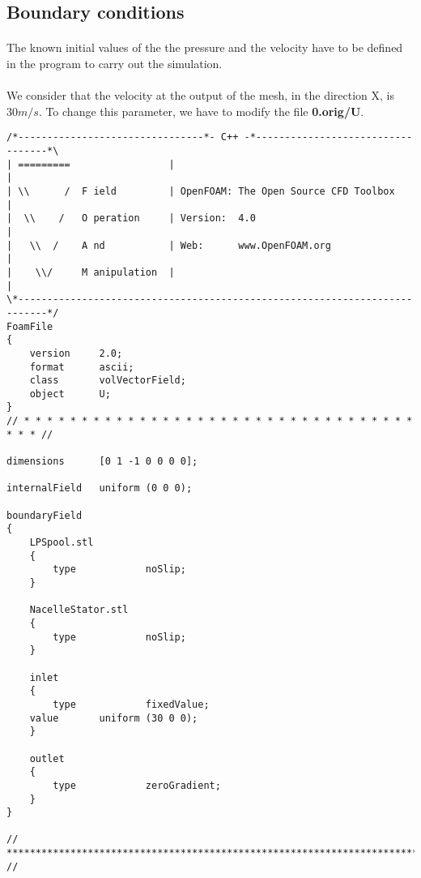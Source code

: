 \subsection{Boundary conditions}
\paragraph{}
The known initial values of the the pressure and the velocity have to be defined in the program to carry out the simulation.

\paragraph{}
We consider that the velocity at the output of the mesh, in the direction X, is $30 m/s$. To change this parameter, we have to modify the file \textbf{0.orig/U}.


\begin{footnotesize}

\begin{verbatim}
/*--------------------------------*- C++ -*----------------------------------*\
| =========                 |                                                 |
| \\      /  F ield         | OpenFOAM: The Open Source CFD Toolbox           |
|  \\    /   O peration     | Version:  4.0                                   |
|   \\  /    A nd           | Web:      www.OpenFOAM.org                      |
|    \\/     M anipulation  |                                                 |
\*---------------------------------------------------------------------------*/
FoamFile
{
    version     2.0;
    format      ascii;
    class       volVectorField;
    object      U;
}
// * * * * * * * * * * * * * * * * * * * * * * * * * * * * * * * * * * * * * //

dimensions      [0 1 -1 0 0 0 0];

internalField   uniform (0 0 0);

boundaryField
{
    LPSpool.stl
    {
        type            noSlip;
    }

    NacelleStator.stl
    {
        type            noSlip;
    }

    inlet
    {
        type            fixedValue;
	value		uniform (30 0 0);
    }

    outlet
    {
        type            zeroGradient;
    }
}

// ************************************************************************* //

\end{verbatim}

\end{footnotesize}

